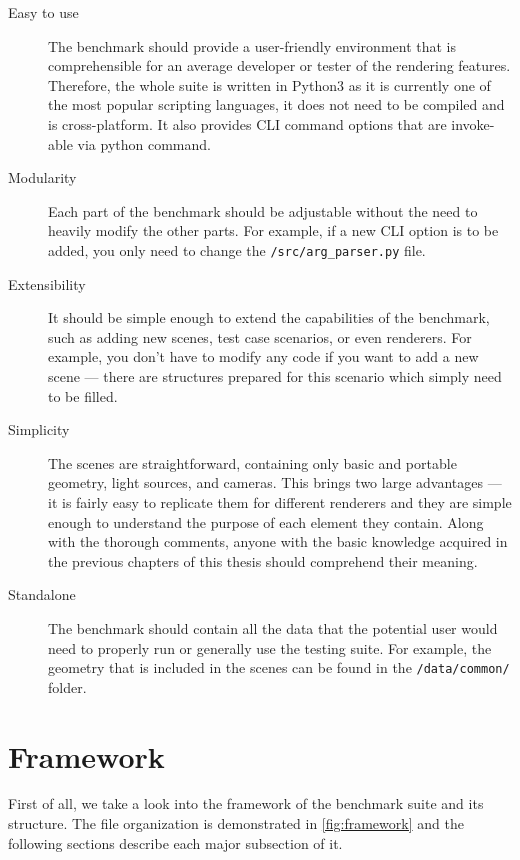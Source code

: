 \begin{description}
	\item[Easy to use] The benchmark should provide a user-friendly environment that is comprehensible for an average developer or tester of the rendering features. Therefore, the whole suite is written in Python3 as it is currently one of the most popular scripting languages, it does not need to be compiled and is cross-platform. It also provides CLI command options that are invoke-able via python command.
	\item[Modularity] Each part of the benchmark should be adjustable without the need to heavily modify the other parts. For example, if a new CLI option is to be added, you only need to change the \texttt{/src/arg\_parser.py} file.
	\item[Extensibility] It should be simple enough to extend the capabilities of the benchmark, such as adding new scenes, test case scenarios, or even renderers. For example, you don't have to modify any code if you want to add a new scene --- there are structures prepared for this scenario which simply need to be filled.
	\item[Simplicity] The scenes are straightforward, containing only basic and portable geometry, light sources, and cameras. This brings two large advantages --- it is fairly easy to replicate them for different renderers and they are simple enough to understand the purpose of each element they contain. Along with the thorough comments, anyone with the basic knowledge acquired in the previous chapters of this thesis should comprehend their meaning.
	\item[Standalone] The benchmark should contain all the data that the potential user would need to properly run or generally use the testing suite. For example, the geometry that is included in the scenes can be found in the \texttt{/data/common/} folder.
\end{description}

\section{Framework}

First of all, we take a look into the framework of the benchmark suite and its structure. The file organization is demonstrated in \autoref{fig:framework} and the following sections describe each major subsection of it.

